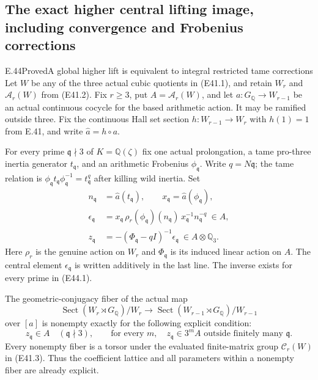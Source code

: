 \subsection{The exact higher central lifting image, including convergence and Frobenius corrections}

\begin{statement}{E.44}{Proved}{A global higher lift is equivalent to integral restricted tame corrections}
Let $W$ be any of the three actual cubic quotients in
(E41.1), and retain $W_r$ and $\mathcal A_r(W)$ from
(E41.2). Fix $r\ge3$, put $A=\mathcal A_r(W)$, and
let $a:G_{\mathbb Q}\to W_{r-1}$ be an actual continuous
cocycle for the based arithmetic action. It may be
ramified outside three. Fix the continuous Hall set
section $h:W_{r-1}\to W_r$ with $h(1)=1$ from E.41,
and write $\widehat a=h\circ a$.

For every prime $\mathfrak q\nmid3$ of
$K=\mathbb Q(\zeta)$ fix one actual prolongation,
a tame pro-three inertia generator $t_{\mathfrak q}$,
and an arithmetic Frobenius $\phi_{\mathfrak q}$.
Write $q=N\mathfrak q$; the tame relation is
$\phi_{\mathfrak q}t_{\mathfrak q}\phi_{\mathfrak q}^{-1}
=t_{\mathfrak q}^q$ after killing wild inertia.
Set
\[
 \begin{split}
 n_{\mathfrak q}&=\widehat a(t_{\mathfrak q}),\qquad
 x_{\mathfrak q}=\widehat a(\phi_{\mathfrak q}),\\
 \epsilon_{\mathfrak q}
  &=x_{\mathfrak q}\,
      \rho_r(\phi_{\mathfrak q})(n_{\mathfrak q})\,
      x_{\mathfrak q}^{-1}n_{\mathfrak q}^{-q}\ \in A,\\
 z_{\mathfrak q}
  &=-(\Phi_{\mathfrak q}-qI)^{-1}\epsilon_{\mathfrak q}
                                  \ \in A\otimes\mathbb Q_3.
 \end{split}
 \tag{E44.1}
\]
Here $\rho_r$ is the genuine action on $W_r$ and
$\Phi_{\mathfrak q}$ is its induced linear action
on $A$. The central element $\epsilon_{\mathfrak q}$
is written additively in the last line. The inverse
exists for every prime in (E44.1).

The geometric-conjugacy fiber of the actual map
\[
 \operatorname{Sect}(W_r\rtimes G_{\mathbb Q})/W_r
       \longrightarrow
 \operatorname{Sect}(W_{r-1}\rtimes G_{\mathbb Q})/W_{r-1}
 \tag{E44.2}
\]
over $[a]$ is nonempty exactly for the following
explicit condition:
\[
 z_{\mathfrak q}\in A\quad(\mathfrak q\nmid3),
 \qquad
 \text{for every }m,\quad
 z_{\mathfrak q}\in3^mA
       \text{ outside finitely many }\mathfrak q.
 \tag{E44.3}
\]
Every nonempty fiber is a torsor under the evaluated
finite-matrix group $\mathcal C_r(W)$ in (E41.3).
Thus the coefficient lattice and all parameters
within a nonempty fiber are already explicit.


\end{statement}
